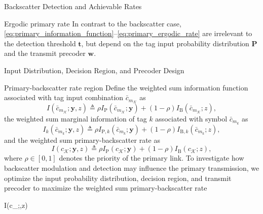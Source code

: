 \documentclass[journal]{IEEEtran}
\begin{document}
\begin{section}{Backscatter Detection and Achievable Rates}
\begin{subsection}{Ergodic primary rate}
			In contrast to the backscatter case, \eqref{eq:primary_information_function}--\eqref{eq:primary_ergodic_rate} are irrelevant to the detection threshold $\boldsymbol{t}$, but depend on the tag input probability distribution $\boldsymbol{P}$ and the transmit precoder $\boldsymbol{w}$.
		\end{subsection}
	\end{section}

	\begin{section}{Input Distribution, Decision Region, and Precoder Design}
		\begin{subsection}{Primary-backscatter rate region}
			Define the weighted sum information function associated with tag input combination $\bar{c}_{m_{\mathcal{K}}}$ as
			\begin{equation}
				I(\bar{c}_{m_{\mathcal{K}}};\boldsymbol{y},z) \triangleq \rho I_{\mathrm{P}}(\bar{c}_{m_{\mathcal{K}}};\boldsymbol{y}) + (1 - \rho) I_{\mathrm{B}}(\bar{c}_{m_{\mathcal{K}}};z),
				\label{eq:weighted_sum_information_function}
			\end{equation}
			the weighted sum marginal information of tag $k$ associated with symbol $\bar{c}_{m_k}$ as
			\begin{equation}
				I_k(\bar{c}_{m_k};\boldsymbol{y},z) \triangleq \rho I_{\mathrm{P},k}(\bar{c}_{m_k};\boldsymbol{y}) + (1 - \rho) I_{\mathrm{B},k}(\bar{c}_{m_k};z),
				\label{eq:weighted_sum_marginal_information}
			\end{equation}
			and the weighted sum primary-backscatter rate as
			\begin{equation}
				I(c_{\mathcal{K}};\boldsymbol{y},z) \triangleq \rho I_{\mathrm{P}}(c_{\mathcal{K}};\boldsymbol{y}) + (1 - \rho) I_{\mathrm{B}}(c_{\mathcal{K}};z),
				\label{eq:weighted_sum_rate}
			\end{equation}
			where $\rho \in [0,1]$ denotes the priority of the primary link. To investigate how backscatter modulation and detection may influence the primary transmission, we optimize the input probability distribution, decision region, and transmit precoder to maximize the weighted sum primary-backscatter rate
			\begin{maxi!}
				{}{I(c_{};,z)}{\label{op:rate_region}}{\label{ob:weighted_sum_rate}}

\end{maxi!}
\end{subsection}
\end{section}
\end{document}
